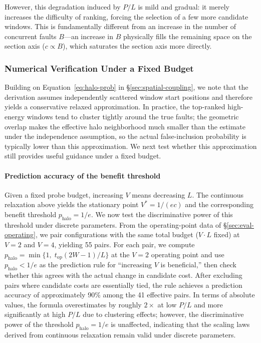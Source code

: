 However, this degradation induced by $P/L$ is mild and gradual: it merely increases the difficulty of ranking, forcing the selection of a few more candidate windows. This is fundamentally different from an increase in the number of concurrent faults $B$---an increase in $B$ physically fills the remaining space on the section axis ($c \propto B$), which saturates the section axis more directly.

\subsubsection{Numerical Verification Under a Fixed Budget}
\label{sec:appendix-isobudget}

Building on Equation~\eqref{eq:halo-prob} in \S\ref{sec:spatial-coupling}, we note that the derivation assumes independently scattered window start positions and therefore yields a conservative relaxed approximation. In practice, the top-ranked high-energy windows tend to cluster tightly around the true faults; the geometric overlap makes the effective halo neighborhood much smaller than the estimate under the independence assumption, so the actual false-inclusion probability is typically lower than this approximation. We next test whether this approximation still provides useful guidance under a fixed budget.

\paragraph{Prediction accuracy of the benefit threshold}

Given a fixed probe budget, increasing $V$ means decreasing $L$. The continuous relaxation above yields the stationary point $V^* = 1/(ec)$ and the corresponding benefit threshold $p_{\mathrm{halo}} = 1/e$. We now test the discriminative power of this threshold under discrete parameters. From the operating-point data of \S\ref{sec:eval-operating}, we pair configurations with the same total budget ($V \cdot L$ fixed) at $V{=}2$ and $V{=}4$, yielding 55 pairs. For each pair, we compute $p_{\mathrm{halo}} = \min\{1,\;t_{\text{op}}(2W{-}1)/L\}$ at the $V{=}2$ operating point and use $p_{\mathrm{halo}} < 1/e$ as the prediction rule for ``increasing $V$ is beneficial,'' then check whether this agrees with the actual change in candidate cost.
After excluding pairs where candidate costs are essentially tied, the rule achieves a prediction accuracy of approximately 90\% among the 41 effective pairs. In terms of absolute values, the formula overestimates by roughly $2\times$ at low $P/L$ and more significantly at high $P/L$ due to clustering effects; however, the discriminative power of the threshold $p_{\mathrm{halo}} = 1/e$ is unaffected, indicating that the scaling laws derived from continuous relaxation remain valid under discrete parameters.

